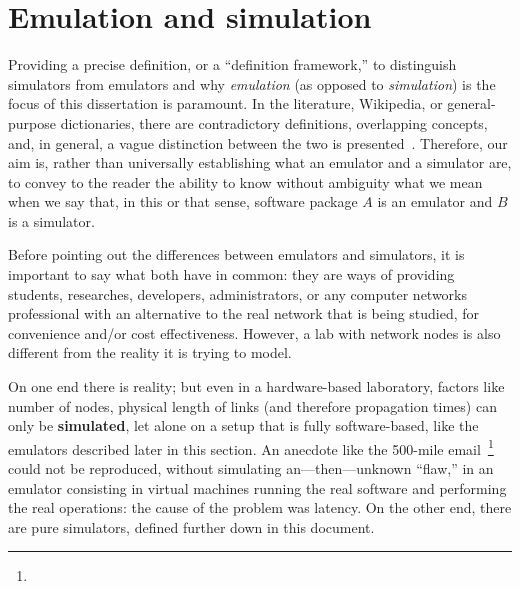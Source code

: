 \section{Emulation and simulation}
\label{sec:leavingemulationandsimulation}

Providing a precise definition, or a ``definition framework,'' to distinguish simulators from emulators and why \emph{emulation} (as opposed to \emph{simulation}) is the focus of this dissertation is paramount.
In the literature, Wikipedia, or general-purpose dictionaries, there are contradictory definitions, overlapping concepts, and, in general, a vague distinction between the two is presented~\cite{netsimoremu}.
Therefore, our aim is, rather than universally establishing what an emulator and a simulator are, to convey to the reader the ability to know without ambiguity what we mean when we say that, in this or that sense, software package $A$ is an emulator and $B$ is a simulator.

Before pointing out the differences between emulators and simulators, it is important to say what both have in common: they are ways of providing students, researches, developers, administrators, or any computer networks professional with an alternative to the real network that is being studied, for convenience and/or cost effectiveness.
However, a lab with network nodes is also different from the reality it is trying to model.

On one end there is reality; but even in a hardware-based laboratory, factors like number of nodes, physical length of links (and therefore propagation times) can only be \textbf{simulated}, let alone on a setup that is fully software-based, like the emulators described later in this section.
An anecdote like the 500-mile email~\footnote{} could not be reproduced, without simulating an---then---unknown ``flaw,'' in an emulator consisting in virtual machines running the real software and performing the real operations: the cause of the problem was latency.
On the other end, there are pure simulators, defined further down in this document.


